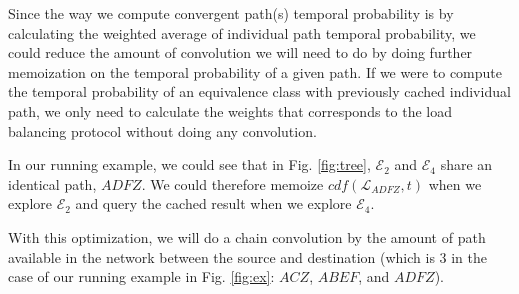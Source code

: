 Since the way we compute convergent path(s) temporal probability is by calculating the weighted average of 
individual path temporal probability, we could reduce the amount of convolution we will need to do by doing further memoization 
on the temporal probability of a given path.
If we were to compute the temporal probability of an equivalence class with previously cached individual 
path, we only need to calculate the weights that corresponds to the load balancing protocol without 
doing any convolution.

In our running example, we could see that in Fig. \ref{fig:tree}, $\mathcal{E}_2$ and $\mathcal{E}_4$ share 
an identical path, $ADFZ$.
We could therefore memoize $cdf(\mathcal{L}_{ADFZ}, t)$ when we explore $\mathcal{E}_2$ and query the 
cached result when we explore $\mathcal{E}_4$.

With this optimization, we will do a chain convolution by the amount of path available in the network between 
the source and destination (which is 3 in the case of our running example in Fig. \ref{fig:ex}: $ACZ$, $ABEF$, 
and $ADFZ$).





